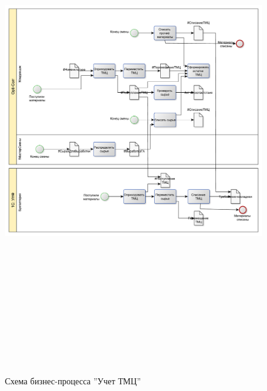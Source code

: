 \begin{figure}[!htb]
\centering
  \includegraphics[width=200mm, height=220mm, angle=90, keepaspectratio]{50_Pics/6 Warehouse.pdf}
\caption{Схема бизнес-процесса ''Учет ТМЦ''}
\label{pic:6_Stock}
\end{figure} 


\clearpage

\clearpage